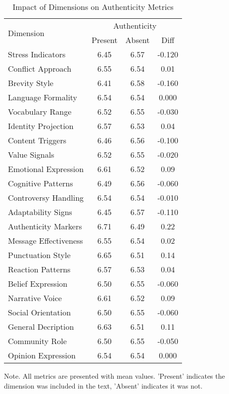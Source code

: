 \begin{table}
\caption{Impact of Dimensions on Authenticity Metrics}
\label{table3}
\begin{tabular}{lccc}
\hline
\multirow{2}{*}{Dimension} & \multicolumn{3}{c}{Authenticity} \\
 & Present & Absent & Diff \\
\hline
Stress Indicators & 6.45 & 6.57 & -0.120 \\
Conflict Approach & 6.55 & 6.54 & 0.01 \\
Brevity Style & 6.41 & 6.58 & -0.160 \\
Language Formality & 6.54 & 6.54 & 0.000 \\
Vocabulary Range & 6.52 & 6.55 & -0.030 \\
Identity Projection & 6.57 & 6.53 & 0.04 \\
Content Triggers & 6.46 & 6.56 & -0.100 \\
Value Signals & 6.52 & 6.55 & -0.020 \\
Emotional Expression & 6.61 & 6.52 & 0.09 \\
Cognitive Patterns & 6.49 & 6.56 & -0.060 \\
Controversy Handling & 6.54 & 6.54 & -0.010 \\
Adaptability Signs & 6.45 & 6.57 & -0.110 \\
Authenticity Markers & 6.71 & 6.49 & 0.22 \\
Message Effectiveness & 6.55 & 6.54 & 0.02 \\
Punctuation Style & 6.65 & 6.51 & 0.14 \\
Reaction Patterns & 6.57 & 6.53 & 0.04 \\
Belief Expression & 6.50 & 6.55 & -0.060 \\
Narrative Voice & 6.61 & 6.52 & 0.09 \\
Social Orientation & 6.50 & 6.55 & -0.060 \\
General Decription & 6.63 & 6.51 & 0.11 \\
Community Role & 6.50 & 6.55 & -0.050 \\
Opinion Expression & 6.54 & 6.54 & 0.000 \\
\hline
\end{tabular}
\begin{tablenotes}
\small
\item Note. All metrics are presented with mean values. 'Present' indicates the dimension was included in the text, 'Absent' indicates it was not.
\end{tablenotes}
\end{table}